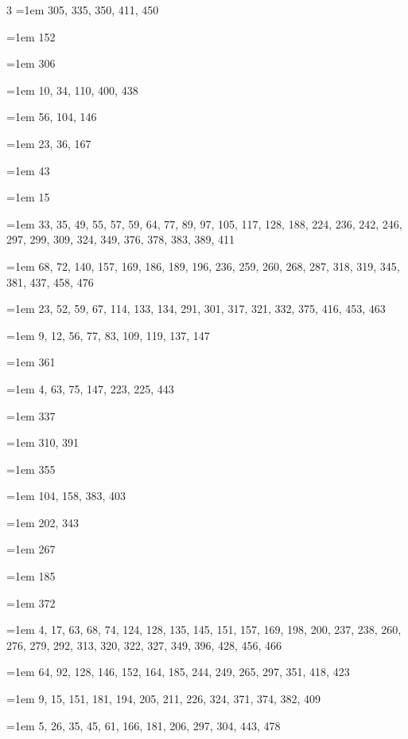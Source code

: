 \begin{multicols}{3}
\hangindent=1em  305, 335, 350, 411, 450\par
\hangindent=1em  152\par
\hangindent=1em  306\par
\hangindent=1em  10, 34, 110, 400, 438\par
\hangindent=1em  56, 104, 146\par
\hangindent=1em  23, 36, 167\par
\hangindent=1em  43\par
\hangindent=1em  15\par
\hangindent=1em  33, 35, 49, 55, 57, 59, 64, 77, 89, 97, 105, 117, 128, 188, 224, 236, 242, 246, 297, 299, 309, 324, 349, 376, 378, 383, 389, 411\par
\hangindent=1em  68, 72, 140, 157, 169, 186, 189, 196, 236, 259, 260, 268, 287, 318, 319, 345, 381, 437, 458, 476\par
\hangindent=1em  23, 52, 59, 67, 114, 133, 134, 291, 301, 317, 321, 332, 375, 416, 453, 463\par
\hangindent=1em  9, 12, 56, 77, 83, 109, 119, 137, 147\par
\hangindent=1em  361\par
\hangindent=1em  4, 63, 75, 147, 223, 225, 443\par
\hangindent=1em  337\par
\hangindent=1em  310, 391\par
\hangindent=1em  355\par
\hangindent=1em  104, 158, 383, 403\par
\hangindent=1em  202, 343\par
\hangindent=1em  267\par
\hangindent=1em  185\par
\hangindent=1em  372\par
\hangindent=1em  4, 17, 63, 68, 74, 124, 128, 135, 145, 151, 157, 169, 198, 200, 237, 238, 260, 276, 279, 292, 313, 320, 322, 327, 349, 396, 428, 456, 466\par
\hangindent=1em  64, 92, 128, 146, 152, 164, 185, 244, 249, 265, 297, 351, 418, 423\par
\hangindent=1em  9, 15, 151, 181, 194, 205, 211, 226, 324, 371, 374, 382, 409\par
\hangindent=1em  5, 26, 35, 45, 61, 166, 181, 206, 297, 304, 443, 478\par

\end{multicols}
